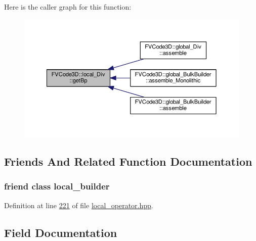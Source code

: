 Here is the caller graph for this function\+:
\nopagebreak
\begin{figure}[H]
\begin{center}
\leavevmode
\includegraphics[width=350pt]{classFVCode3D_1_1local__Div_aaed22251b9f77eec2f0ea5321cfb8ad5_icgraph}
\end{center}
\end{figure}




\subsection{Friends And Related Function Documentation}
\subsubsection[{\texorpdfstring{local\+\_\+builder}{local_builder}}]{\setlength{\rightskip}{0pt plus 5cm}friend class {\bf local\+\_\+builder}\hspace{0.3cm}{\ttfamily [friend]}}\hypertarget{classFVCode3D_1_1local__Div_abcd35ed5f4c4c65e5aee0132d25150ff}{}\label{classFVCode3D_1_1local__Div_abcd35ed5f4c4c65e5aee0132d25150ff}


Definition at line \hyperlink{local__operator_8hpp_source_l00221}{221} of file \hyperlink{local__operator_8hpp_source}{local\+\_\+operator.\+hpp}.



\subsection{Field Documentation}
